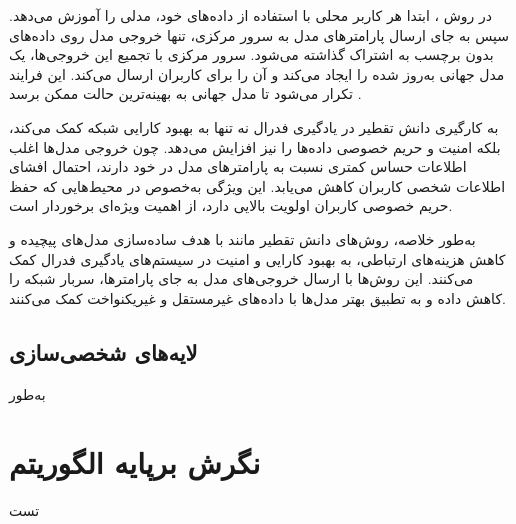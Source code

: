 در روش
%
، ابتدا هر کاربر محلی با استفاده از داده‌های خود، مدلی را آموزش می‌دهد. سپس به جای ارسال پارامترهای مدل به سرور مرکزی، تنها خروجی مدل روی داده‌های بدون برچسب به اشتراک گذاشته می‌شود. سرور مرکزی با تجمیع این خروجی‌ها، یک مدل جهانی به‌روز شده را ایجاد می‌کند و آن را برای کاربران ارسال می‌کند. این فرایند تکرار می‌شود تا مدل جهانی به بهینه‌ترین حالت ممکن برسد
\cite{itahara2021distillation}.

به کارگیری دانش تقطیر در یادگیری فدرال نه تنها به بهبود کارایی شبکه کمک می‌کند، بلکه امنیت و حریم خصوصی داده‌ها را نیز افزایش می‌دهد. چون خروجی مدل‌ها اغلب اطلاعات حساس کمتری نسبت به پارامترهای مدل در خود دارند، احتمال افشای اطلاعات شخصی کاربران کاهش می‌یابد. این ویژگی به‌خصوص در محیط‌هایی که حفظ حریم خصوصی کاربران اولویت بالایی دارد، از اهمیت ویژه‌ای برخوردار است.

به‌طور خلاصه، روش‌های دانش تقطیر مانند
با هدف ساده‌سازی مدل‌های پیچیده و کاهش هزینه‌های ارتباطی، به بهبود کارایی و امنیت در سیستم‌های یادگیری فدرال کمک می‌کنند. این روش‌ها با ارسال خروجی‌های مدل به جای پارامترها، سربار شبکه را کاهش داده و به تطبیق بهتر مدل‌ها با داده‌های غیرمستقل و غیریکنواخت کمک می‌کنند.


\subsection{
	لایه‌های شخصی‌سازی%
	\protect
}
به‌طور 




\section{نگرش برپایه الگوریتم}
تست
